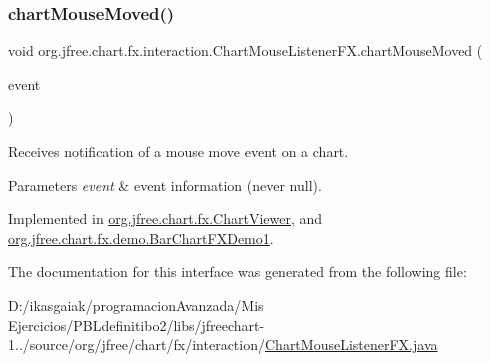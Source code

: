 \mbox{\label{interfaceorg_1_1jfree_1_1chart_1_1fx_1_1interaction_1_1_chart_mouse_listener_f_x_aaf568a1fc8349de289cc6dbc39a277c2}} 
\subsubsection{\texorpdfstring{chart\+Mouse\+Moved()}{chartMouseMoved()}}
{\footnotesize\ttfamily void org.\+jfree.\+chart.\+fx.\+interaction.\+Chart\+Mouse\+Listener\+F\+X.\+chart\+Mouse\+Moved (\begin{DoxyParamCaption}\item[{\mbox{\hyperlink{classorg_1_1jfree_1_1chart_1_1fx_1_1interaction_1_1_chart_mouse_event_f_x}{Chart\+Mouse\+Event\+FX}}}]{event }\end{DoxyParamCaption})}

Receives notification of a mouse move event on a chart.


\begin{DoxyParams}{Parameters}
{\em event} & event information (never {\ttfamily null}). \\
\hline
\end{DoxyParams}


Implemented in \mbox{\hyperlink{classorg_1_1jfree_1_1chart_1_1fx_1_1_chart_viewer_ad9cb6ad74904822db234d14c8356c05d}{org.\+jfree.\+chart.\+fx.\+Chart\+Viewer}}, and \mbox{\hyperlink{classorg_1_1jfree_1_1chart_1_1fx_1_1demo_1_1_bar_chart_f_x_demo1_a4a857882137d18dc9aec3ef0811abf73}{org.\+jfree.\+chart.\+fx.\+demo.\+Bar\+Chart\+F\+X\+Demo1}}.



The documentation for this interface was generated from the following file\+:\begin{DoxyCompactItemize}
\item 
D\+:/ikasgaiak/programacion\+Avanzada/\+Mis Ejercicios/\+P\+B\+Ldefinitibo2/libs/jfreechart-\/1../source/org/jfree/chart/fx/interaction/\mbox{\hyperlink{_chart_mouse_listener_f_x_8java}{Chart\+Mouse\+Listener\+F\+X.\+java}}\end{DoxyCompactItemize}
